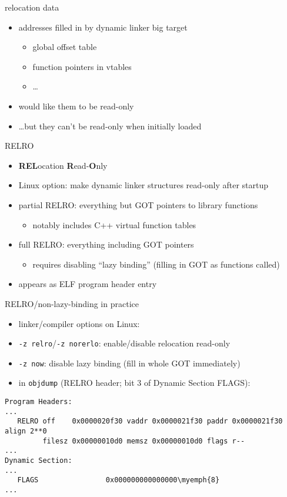 \begin{frame}{relocation data}
    \begin{itemize}
    \item addresses filled in by dynamic linker big target
        \begin{itemize}
        \item global offset table
        \item function pointers in vtables
        \item \ldots
        \end{itemize}
    \item would like them to be read-only
    \item \ldots but they can't be read-only when initially loaded
    \end{itemize}
\end{frame}

\begin{frame}{RELRO}
    \begin{itemize}
        \item \textbf{REL}ocation \textbf{R}ead-\textbf{O}nly
        \item Linux option: make dynamic linker structures read-only after startup
        \item partial RELRO: everything but GOT pointers to library functions
            \begin{itemize}
            \item notably includes C++ virtual function tables
            \end{itemize}
        \item full RELRO: everything including GOT pointers
            \begin{itemize}
            \item requires disabling ``lazy binding'' (filling in GOT as functions called)
            \end{itemize}
        \item appears as ELF program header entry
    \end{itemize}
\end{frame}

\begin{frame}[fragile]{RELRO/non-lazy-binding in practice}
\begin{itemize}
\item linker/compiler options on Linux:
\item \texttt{-z relro}/\texttt{-z norerlo}: enable/disable relocation read-only
\item \texttt{-z now}: disable lazy binding (fill in whole GOT immediately)
\item in \texttt{objdump} (RELRO header; bit 3 of Dynamic Section FLAGS):
\end{itemize}
\begin{Verbatim}[fontsize=\small,commandchars=\\\{\}]
Program Headers:
...
   RELRO off    0x0000020f30 vaddr 0x0000021f30 paddr 0x0000021f30 align 2**0
         filesz 0x00000010d0 memsz 0x00000010d0 flags r--
...
Dynamic Section:
...
   FLAGS                0x000000000000000\myemph{8}
...
\end{Verbatim}
\end{frame}


